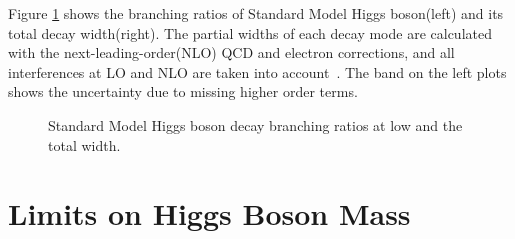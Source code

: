 Figure \ref{fig:YRHXS2_BR_Fig1} shows the branching ratios of Standard 
Model Higgs boson(left) and its total decay width(right). The partial widths of each 
decay mode are calculated with the next-leading-order(NLO) QCD 
and electron corrections, and all interferences at LO and NLO are 
taken into account~\cite{Dittmaier:1318996}. The band on the left plots 
shows the uncertainty due to missing higher order terms. 
%
\begin{figure}[htp]
\centering
{}
\caption{Standard Model Higgs boson decay branching ratios at low \mHi 
and the total width.}
\label{fig:YRHXS2_BR_Fig1}
\end{figure}


\newpage
\section{Limits on Higgs Boson Mass} 


